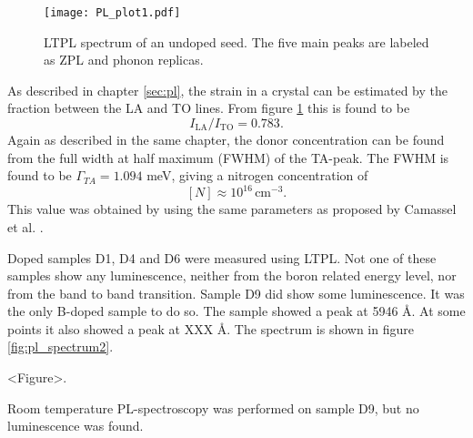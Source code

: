 \begin{figure}[h]
\begin{center}
\texttt{[image: PL\_plot1.pdf]}
\caption{LTPL spectrum of an undoped seed. The five main peaks are labeled as ZPL and phonon replicas. 
\label{fig:pl_spectrum1}}
\end{center}
\end{figure}

As described in chapter \ref{sec:pl}, the strain in a crystal can be estimated by the fraction between the LA and TO lines. From figure \ref{fig:pl_spectrum1} this is found to be 
\[I_\mathrm{LA}/I_\mathrm{TO} = 0.783.\]
Again as described in the same chapter, the donor concentration can be found from the full width at half maximum (FWHM) of the TA-peak. The FWHM is found to be $\Gamma_{TA} = 1.094$ meV, giving a nitrogen concentration of 
\[[N] \approx 10^{16} \, \mathrm{cm^{-3}}.\]
This value was obtained by using the same parameters as proposed by Camassel et al. \cite{Camassel2006}. 

Doped samples D1, D4 and D6 were measured using LTPL. Not one of these samples show any luminescence, neither from the boron related energy level, nor from the band to band transition. Sample D9 did show some luminescence. It was the only B-doped sample to do so. The sample showed a peak at 5946 Å. At some points it also showed a peak at XXX Å. The spectrum is shown in figure \ref{fig:pl_spectrum2}. 

<Figure>.

Room temperature PL-spectroscopy was performed on sample D9, but no luminescence was found. 
































